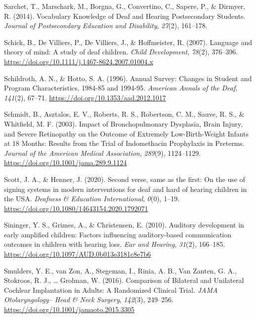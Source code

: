 \documentclass[english,man]{apa6}
\begin{document}
\leavevmode\hypertarget{ref-sarchet2014}{}%
Sarchet, T., Marschark, M., Borgna, G., Convertino, C., Sapere, P., \& Dirmyer, R. (2014). Vocabulary Knowledge of Deaf and Hearing Postsecondary Students. \emph{Journal of Postsecondary Education and Disability}, \emph{27}(2), 161--178.

\leavevmode\hypertarget{ref-schick2007}{}%
Schick, B., De Villiers, P., De Villiers, J., \& Hoffmeister, R. (2007). Language and theory of mind: A study of deaf children. \emph{Child Development}, \emph{78}(2), 376--396. \url{https://doi.org/10.1111/j.1467-8624.2007.01004.x}

\leavevmode\hypertarget{ref-schildroth1996}{}%
Schildroth, A. N., \& Hotto, S. A. (1996). Annual Survey: Changes in Student and Program Characteristics, 1984-85 and 1994-95. \emph{American Annals of the Deaf}, \emph{141}(2), 67--71. \url{https://doi.org/10.1353/aad.2012.1017}

\leavevmode\hypertarget{ref-schmidt2003}{}%
Schmidt, B., Asztalos, E. V., Roberts, R. S., Robertson, C. M., Sauve, R. S., \& Whitfield, M. F. (2003). Impact of Bronchopulmonary Dysplasia, Brain Injury, and Severe Retinopathy on the Outcome of Extremely Low-Birth-Weight Infants at 18 Months: Results from the Trial of Indomethacin Prophylaxis in Preterms. \emph{Journal of the American Medical Association}, \emph{289}(9), 1124--1129. \url{https://doi.org/10.1001/jama.289.9.1124}

\leavevmode\hypertarget{ref-scott2020}{}%
Scott, J. A., \& Henner, J. (2020). Second verse, same as the first: On the use of signing systems in modern interventions for deaf and hard of hearing children in the USA. \emph{Deafness \& Education International}, \emph{0}(0), 1--19. \url{https://doi.org/10.1080/14643154.2020.1792071}

\leavevmode\hypertarget{ref-sininger2010}{}%
Sininger, Y. S., Grimes, A., \& Christensen, E. (2010). Auditory development in early amplified children: Factors influencing auditory-based communication outcomes in children with hearing loss. \emph{Ear and Hearing}, \emph{31}(2), 166--185. \url{https://doi.org/10.1097/AUD.0b013e3181c8e7b6}

\leavevmode\hypertarget{ref-smulders2016}{}%
Smulders, Y. E., van Zon, A., Stegeman, I., Rinia, A. B., Van Zanten, G. A., Stokroos, R. J., \ldots{} Grolman, W. (2016). Comparison of Bilateral and Unilateral Cochlear Implantation in Adults: A Randomized Clinical Trial. \emph{JAMA Otolaryngology-- Head \& Neck Surgery}, \emph{142}(3), 249--256. \url{https://doi.org/10.1001/jamaoto.2015.3305}
\end{document}
